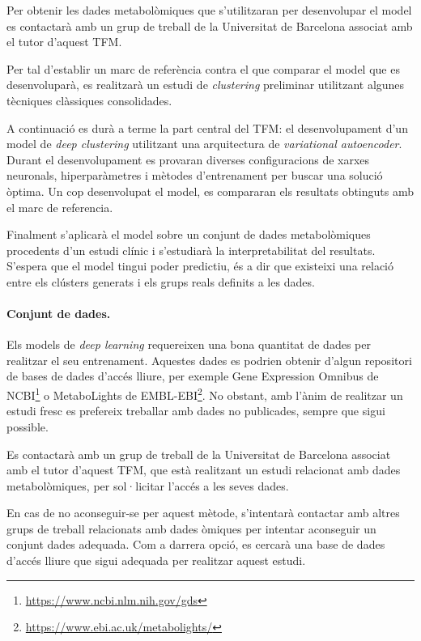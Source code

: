 \documentclass[CAT,BIB]{TFUOC}%
\begin{document}
    Per obtenir les dades metabolòmiques que s'utilitzaran per desenvolupar el model es contactarà amb un grup de treball de la Universitat de Barcelona associat amb el tutor d'aquest TFM.

    Per tal d'establir un marc de referència contra el que comparar el model que es desenvoluparà, es realitzarà un estudi de \textit{clustering} preliminar utilitzant algunes tècniques clàssiques consolidades.

    A continuació es durà a terme la part central del TFM: el desenvolupament d'un model de \textit{deep clustering} utilitzant una arquitectura de \textit{variational autoencoder}. Durant el desenvolupament es provaran diverses configuracions de xarxes neuronals, hiperparàmetres i mètodes d'entrenament per buscar una solució òptima. Un cop desenvolupat el model, es compararan els resultats obtinguts amb el marc de referencia.

    Finalment s'aplicarà el model sobre un conjunt de dades metabolòmiques procedents d'un estudi clínic i s'estudiarà la interpretabilitat del resultats. S'espera que el model tingui poder predictiu, és a dir que existeixi una relació entre els clústers generats i els grups reals definits a les dades.

    \paragraph{Conjunt de dades.}

        Els models de \textit{deep learning} requereixen una bona quantitat de dades per realitzar el seu entrenament. Aquestes dades es podrien obtenir d'algun repositori de bases de dades d'accés lliure, per exemple Gene Expression Omnibus de NCBI\footnote{\url{https://www.ncbi.nlm.nih.gov/gds}} o MetaboLights de EMBL-EBI\footnote{\url{https://www.ebi.ac.uk/metabolights/}}. No obstant, amb l'ànim de realitzar un estudi fresc es prefereix treballar amb dades no publicades, sempre que sigui possible.

        Es contactarà amb un grup de treball de la Universitat de Barcelona associat amb el tutor d'aquest TFM, que està realitzant un estudi relacionat amb dades metabolòmiques, per sol·licitar l'accés a les seves dades.

        En cas de no aconseguir-se per aquest mètode, s'intentarà contactar amb altres grups de treball relacionats amb dades òmiques per intentar aconseguir un conjunt dades adequada. Com a darrera opció, es cercarà una base de dades d'accés lliure que sigui adequada per realitzar aquest estudi.
\end{document}
